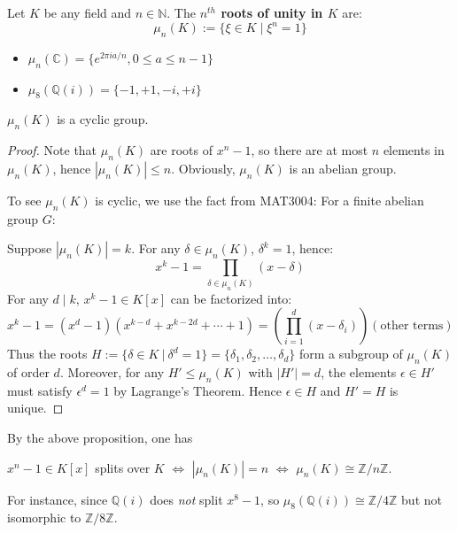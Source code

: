 \begin{definition}
Let $ K $ be any field and $ n \in \mathbb{N} $. The {\bf $n^{th}$ roots of unity in $ K $} are:
$$
\mu_n(K) := \{ \xi \in K \mid \xi^n = 1 \}
$$
\end{definition}
\begin{example}
    \begin{itemize}
        \item $\mu_n(\mathbb{C})=\{e^{2\pi i a/n},0\leq a\leq n-1\}$
        \item $\mu_8(\mathbb{Q}(i))=\{-1,+1,-i,+i\}$
    \end{itemize}
\end{example}

\begin{proposition}
    $\mu_n(K)$ is a cyclic group.
\end{proposition}
\begin{proof}
Note that $\mu_n(K)$ are roots of $x^n - 1$, so there are at most $n$ elements in $\mu_n(K)$, hence $|\mu_n(K)| \leq n$. Obviously, $\mu_n(K)$ is an abelian group.

To see $\mu_n(K)$ is cyclic, we use the fact from MAT3004: For a finite abelian group $G$:
\begin{center}
\end{center}


Suppose $|\mu_n(K)| = k$. For any $\delta \in \mu_n(K)$, $\delta^k = 1$, hence:
$$
x^k - 1 = \prod_{\delta \in \mu_n(K)} (x - \delta)
$$
For any $d \mid k$, $x^k-1 \in K[x]$ can be factorized into:
$$
x^k - 1 = (x^d - 1)\left(x^{k-d} + x^{k-2d} + \cdots + 1\right)=\left(\prod_{i=1}^{d}(x-\delta_i)\right)\left(\text{other terms}\right)
$$
Thus the roots $H :=\{\delta\in K\ |\  \delta^d=1 \} = \{\delta_1, \delta_2, \ldots, \delta_d\}$ form a subgroup of $\mu_n(K)$ of order $d$. Moreover, for any $H' \leq \mu_n(K)$ with $|H'| =d$, the elements $\epsilon \in H'$ must satisfy $\epsilon^d = 1$ by Lagrange's Theorem. Hence $\epsilon \in H$ and $H' = H$ is unique.\qedhere
\end{proof}

\begin{remark}
By the above proposition, one has 
\begin{center}
$ x^n - 1 \in K[x]$ splits over $K$ \quad $\Leftrightarrow$ \quad $|\mu_n(K)| = n$ \quad $\Leftrightarrow$ \quad $\mu_n(K) \cong \mathbb{Z}/n\mathbb{Z}$.    
\end{center}
For instance, since $ \mathbb{Q}(i) $ does \emph{not} split $ x^8 - 1 $, so
$
\mu_8(\mathbb{Q}(i)) \cong \mathbb{Z}/4\mathbb{Z}$ but not isomorphic to $\mathbb{Z}/8\mathbb{Z}
$.
\end{remark}

